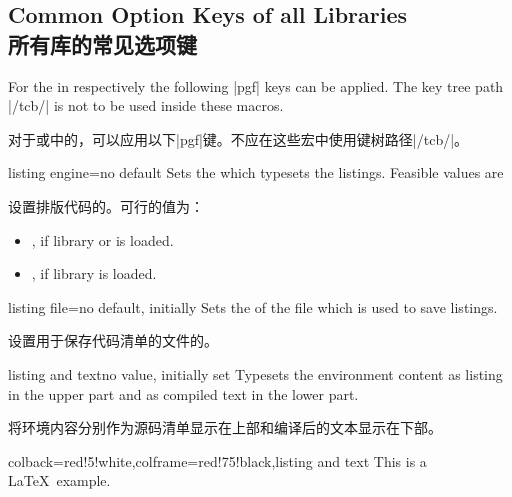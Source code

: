 \subsection{Common Option Keys of all Libraries\\所有库的常见选项键}\label{sec:commonlistingkeys}

For the  in  respectively 
the following |pgf| keys can be applied. The key tree path |/tcb/| is not to
be used inside these macros.

对于或中的，可以应用以下|pgf|键。不应在这些宏中使用键树路径|/tcb/|。
\begin{docTcbKey}{listing engine}{=}{no default}
Sets the  which typesets the listings. Feasible values are

设置排版代码的。可行的值为： %
\begin{itemize}
\item{}, if library  or
 is loaded.
\item{}, if library  is loaded.
\end{itemize}
\end{docTcbKey}

\begin{docTcbKey}{listing file}{=}{no default, initially }
Sets the  of the file which is used to save listings.

设置用于保存代码清单的文件的。
\end{docTcbKey}


\begin{docTcbKey}{listing and text}{}{no value, initially set}
Typesets the environment content as listing in the upper part and
as compiled text in the lower part.

将环境内容分别作为源码清单显示在上部和编译后的文本显示在下部。
\begin{dispExample}
\begin{tcblisting}{colback=red!5!white,colframe=red!75!black,listing and text}
This is a \LaTeX\ example.
\end{tcblisting}
\end{dispExample}
\end{docTcbKey}


